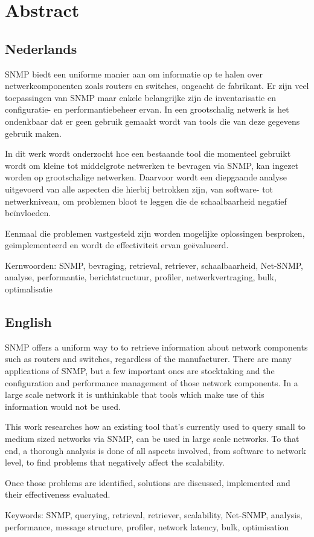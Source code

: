 \chapter*{Abstract}

\section*{Nederlands}

SNMP biedt een uniforme manier aan om informatie op te halen over netwerkcomponenten zoals routers en switches, ongeacht de fabrikant.
Er zijn veel toepassingen van SNMP maar enkele belangrijke zijn de inventarisatie en configuratie- en performantiebeheer ervan.
In een grootschalig netwerk is het ondenkbaar dat er geen gebruik gemaakt wordt van tools die van deze gegevens gebruik maken.

In dit werk wordt onderzocht hoe een bestaande tool die momenteel gebruikt wordt om kleine tot middelgrote netwerken te bevragen via SNMP,
kan ingezet worden op grootschalige netwerken.
Daarvoor wordt een diepgaande analyse uitgevoerd van alle aspecten die hierbij betrokken zijn,
van software- tot netwerkniveau, om problemen bloot te leggen die de schaalbaarheid negatief beïnvloeden.

Eenmaal die problemen vastgesteld zijn worden mogelijke oplossingen besproken, geïmplementeerd en wordt de effectiviteit ervan geëvalueerd.


Kernwoorden: SNMP, bevraging, retrieval, retriever, schaalbaarheid, Net-SNMP, analyse, performantie, berichtstructuur, profiler, netwerkvertraging, bulk, optimalisatie


\section*{English}

SNMP offers a uniform way to to retrieve information about network components such as routers and switches, regardless of the manufacturer.
There are many applications of SNMP, but a few important ones are stocktaking and the configuration and performance management of those network components.
In a large scale network it is unthinkable that tools which make use of this information would not be used.

This work researches how an existing tool that's currently used to query small to medium sized networks via SNMP,
can be used in large scale networks.
To that end, a thorough analysis is done of all aspects involved, from software to network level, to find problems that negatively affect the scalability.

Once those problems are identified, solutions are discussed, implemented and their effectiveness evaluated.


Keywords: SNMP, querying, retrieval, retriever, scalability, Net-SNMP, analysis, performance, message structure, profiler, network latency, bulk, optimisation